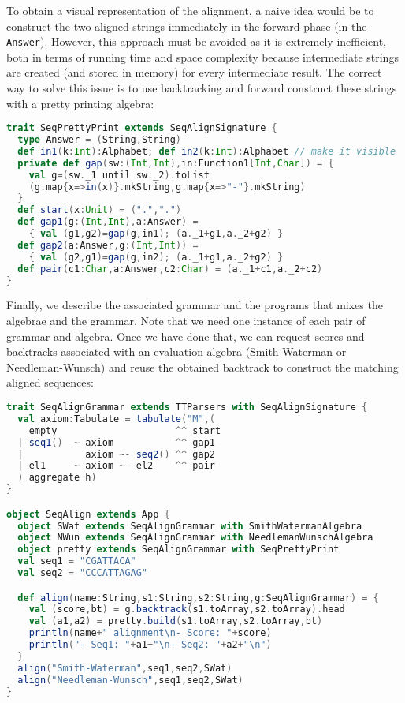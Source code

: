 To obtain a visual representation of the alignment, a naive idea would be to construct the two aligned strings immediately in the forward phase (in the {\tt Answer}). However, this approach must be avoided as it is extremely inefficient, both in terms of running time and space complexity because intermediate strings are created (and stored in memory) for every intermediate result. The correct way to solve this issue is to use backtracking and forward construct these strings with a pretty printing algebra:
\begin{lstlisting}[language=Scala,captionpos=none]
trait SeqPrettyPrint extends SeqAlignSignature {
  type Answer = (String,String)
  def in1(k:Int):Alphabet; def in2(k:Int):Alphabet // make it visible
  private def gap(sw:(Int,Int),in:Function1[Int,Char]) = {
    val g=(sw._1 until sw._2).toList
    (g.map{x=>in(x)}.mkString,g.map{x=>"-"}.mkString)
  }
  def start(x:Unit) = (".",".")
  def gap1(g:(Int,Int),a:Answer) =
    { val (g1,g2)=gap(g,in1); (a._1+g1,a._2+g2) }
  def gap2(a:Answer,g:(Int,Int)) =
    { val (g2,g1)=gap(g,in2); (a._1+g1,a._2+g2) }
  def pair(c1:Char,a:Answer,c2:Char) = (a._1+c1,a._2+c2)
}
\end{lstlisting}

Finally, we describe the associated grammar and the programs that mixes the algebrae and the grammar. Note that we need one instance of each pair of grammar and algebra. Once we have done that, we can request scores and backtracks associated with an evaluation algebra (Smith-Waterman or Needleman-Wunsch) and reuse the obtained backtrack to construct the matching aligned sequences:
\begin{lstlisting}[language=Scala,captionpos=none]
trait SeqAlignGrammar extends TTParsers with SeqAlignSignature {
  val axiom:Tabulate = tabulate("M",(
    empty                     ^^ start
  | seq1() -~ axiom           ^^ gap1
  |           axiom ~- seq2() ^^ gap2
  | el1    -~ axiom ~- el2    ^^ pair
  ) aggregate h)
}

object SeqAlign extends App {
  object SWat extends SeqAlignGrammar with SmithWatermanAlgebra
  object NWun extends SeqAlignGrammar with NeedlemanWunschAlgebra
  object pretty extends SeqAlignGrammar with SeqPrettyPrint
  val seq1 = "CGATTACA"
  val seq2 = "CCCATTAGAG"

  def align(name:String,s1:String,s2:String,g:SeqAlignGrammar) = {
    val (score,bt) = g.backtrack(s1.toArray,s2.toArray).head
    val (a1,a2) = pretty.build(s1.toArray,s2.toArray,bt)
    println(name+" alignment\n- Score: "+score)
    println("- Seq1: "+a1+"\n- Seq2: "+a2+"\n")
  }
  align("Smith-Waterman",seq1,seq2,SWat)
  align("Needleman-Wunsch",seq1,seq2,SWat)
}
\end{lstlisting}

